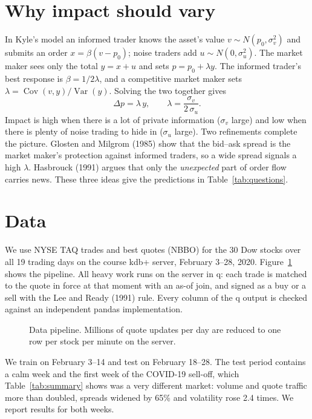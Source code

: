 \documentclass[10pt,letterpaper]{article}
\begin{document}
\section{Why impact should vary}
In Kyle's model an informed trader knows the asset's value $v \sim N(p_0, \sigma_v^2)$ and submits an order $x = \beta(v - p_0)$; noise traders add $u \sim N(0, \sigma_u^2)$. The market maker sees only the total $y = x + u$ and sets $p = p_0 + \lambda y$. The informed trader's best response is $\beta = 1/2\lambda$, and a competitive market maker sets $\lambda = \operatorname{Cov}(v, y)/\operatorname{Var}(y)$. Solving the two together gives
\begin{equation}
\Delta p = \lambda \, y, \qquad \lambda = \frac{\sigma_v}{2\,\sigma_u}.
\end{equation}
Impact is high when there is a lot of private information ($\sigma_v$ large) and low when there is plenty of noise trading to hide in ($\sigma_u$ large). Two refinements complete the picture. Glosten and Milgrom (1985) show that the bid--ask spread is the market maker's protection against informed traders, so a wide spread signals a high $\lambda$. Hasbrouck (1991) argues that only the \emph{unexpected} part of order flow carries news. These three ideas give the predictions in Table~\ref{tab:questions}.

\section{Data}
We use NYSE TAQ trades and best quotes (NBBO) for the 30 Dow stocks over all 19 trading days on the course kdb+ server, February 3--28, 2020. Figure~\ref{fig:pipeline} shows the pipeline. All heavy work runs on the server in q: each trade is matched to the quote in force at that moment with an as-of join, and signed as a buy or a sell with the Lee and Ready (1991) rule. Every column of the q output is checked against an independent pandas implementation.

\begin{figure}[h]
\centering

\caption{Data pipeline. Millions of quote updates per day are reduced to one row per stock per minute on the server.}\label{fig:pipeline}
\end{figure}

We train on February 3--14 and test on February 18--28. The test period contains a calm week and the first week of the COVID-19 sell-off, which Table~\ref{tab:summary} shows was a very different market: volume and quote traffic more than doubled, spreads widened by 65\% and volatility rose 2.4 times. We report results for both weeks.
\end{document}
